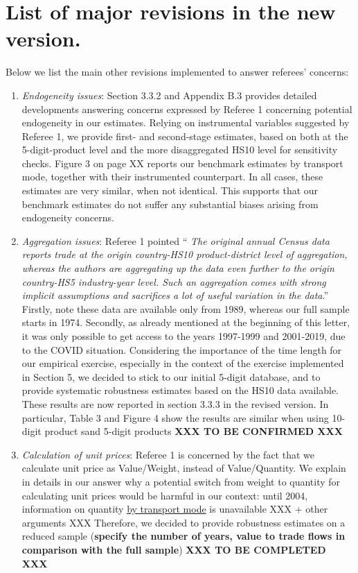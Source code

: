 \documentclass[12pt]{article}
\begin{document}
\section{List of major revisions in the new version.}

Below we list the main other revisions implemented to answer referees' concerns:

\begin{enumerate}


\item \emph{Endogeneity issues}: Section 3.3.2 and Appendix B.3 provides detailed developments answering concerns expressed by Referee 1 concerning potential endogeneity in our estimates. Relying on instrumental variables suggested by Referee 1, we provide first- and second-stage estimates, based on both at the 5-digit-product level and the more disaggregated HS10 level for sensitivity checks. Figure 3 on page XX reports our benchmark estimates by transport mode, together with their instrumented counterpart. In all cases, these estimates are very similar, when not identical. This supports that our benchmark estimates do not suffer any substantial biases arising from endogeneity concerns.
    
\item \emph{Aggregation issues}: Referee 1 pointed `` \emph{The original annual Census data reports trade at the origin country-HS10 product-district level of aggregation, whereas the authors are aggregating up the data even further to the origin country-HS5 industry-year level. Such an aggregation comes with strong implicit assumptions and sacrifices a lot of useful variation in the data}.'' Firstly, note these data are available only from 1989, whereas our full sample starts in 1974. Secondly, as already mentioned at the beginning of this letter, it was only possible to get access to the years 1997-1999 and 2001-2019, due to the COVID situation. Considering the importance of the time length for our empirical exercise, especially in the context of the exercise implemented in Section 5, we decided to stick to our initial 5-digit database, and to provide systematic robustness estimates based on the HS10 data available. These results are now reported in section 3.3.3 in the revised version. In particular, Table 3 and Figure 4 show the results are similar when using 10-digit product sand 5-digit products \textbf{XXX TO BE CONFIRMED XXX}
    
\item \emph{Calculation of unit prices}: Referee 1 is concerned by the fact that we calculate unit price as Value/Weight, instead of Value/Quantity. We explain in details in our answer why a potential switch from weight to quantity for calculating unit prices would be harmful in our context: until 2004, information on quantity \underline{by transport mode} is unavailable XXX + other arguments XXX Therefore, we decided to provide robustness estimates on a reduced sample (\textbf{specify the number of years, value to trade flows in comparison with the full sample}) \textbf{XXX TO BE COMPLETED XXX}




\end{enumerate}
\end{document}
